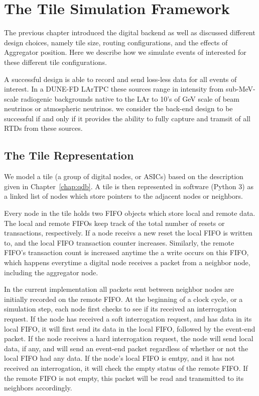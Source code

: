 \section{The Tile Simulation Framework}

The previous chapter introduced the digital backend as well as discussed different design choices, namely tile size, routing configurations, and the effects of Aggregator position.
Here we describe how we simulate events of interested for these different tile configurations.

A successful design is able to record and send loss-less data for all events of interest.
In a DUNE-FD LArTPC these sources range in intensity from sub-MeV-scale radiogenic backgrounds native to the LAr to 10's of GeV scale of beam neutrinos or atmospheric neutrinos.
we consider the back-end design to be successful if and only if it provides the ability to fully capture and tramsit of all RTDs from these sources.

\subsection{The Tile Representation}

We model a tile (a group of digital nodes, or ASICs) based on the description given in Chapter~\ref{chap:qdb}.
A tile is then represented in software (Python 3) as a linked list of nodes which store pointers to the adjacent nodes or neighbors.

Every node in the tile holds two FIFO objects which store local and remote data. 
The local and remote FIFOs keep track of the total number of resets or transactions, respectively.
If a node receivs a new reset the local FIFO is written to, and the local FIFO transaction counter increases.
Similarly, the remote FIFO's transaction count is increased anytime the a write occurs on this FIFO, which happens everytime a digital node receives a packet from a neighbor node, including the aggregator node.

In the current implementation all packets sent between neighbor nodes are initially recorded on the remote FIFO.
At the beginning of a clock cycle, or a simulation step, each node first checks to see if its received an interrogation request.
If the node has received a soft interrogation request, and has data in its local FIFO, it will first send its data in the local FIFO, followed by the event-end packet.
If the node receives a hard interrogation request, the node will send local data, if any, and will send an event-end packet regardless of whether or not the local FIFO had any data.
If the node's local FIFO is emtpy, and it has not received an interrogation, it will check the empty status of the remote FIFO.
If the remote FIFO is not empty, this packet will be read and transmitted to its neighbors accordingly.

